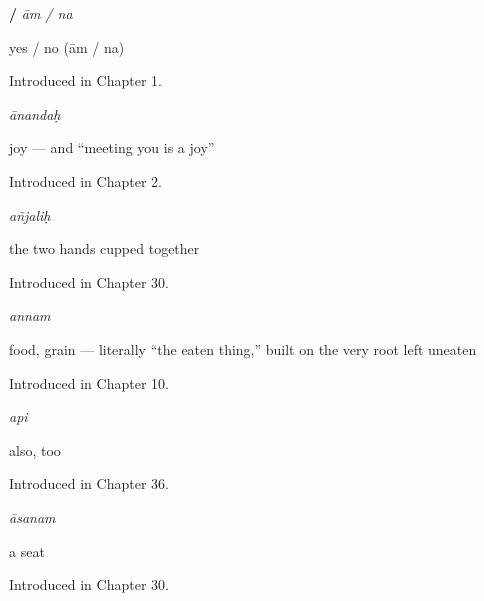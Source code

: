 \noindent\begin{minipage}[t]{\linewidth}
\raggedright
\textbf{ / }\enspace\emph{ām / na}\par
\small yes / no (ām / na)\par
\footnotesize Introduced in Chapter 1.
\end{minipage}\par\medskip

\noindent\begin{minipage}[t]{\linewidth}
\raggedright
\textbf{}\enspace\emph{ānandaḥ}\par
\small joy — and \textquotedblleft{}meeting you is a joy\textquotedblright{}\par
\footnotesize Introduced in Chapter 2.
\end{minipage}\par\medskip

\noindent\begin{minipage}[t]{\linewidth}
\raggedright
\textbf{}\enspace\emph{añjaliḥ}\par
\small the two hands cupped together\par
\footnotesize Introduced in Chapter 30.
\end{minipage}\par\medskip

\noindent\begin{minipage}[t]{\linewidth}
\raggedright
\textbf{}\enspace\emph{annam}\par
\small food, grain — literally \textquotedblleft{}the eaten thing,\textquotedblright{} built on the very root  left uneaten\par
\footnotesize Introduced in Chapter 10.
\end{minipage}\par\medskip

\noindent\begin{minipage}[t]{\linewidth}
\raggedright
\textbf{}\enspace\emph{api}\par
\small also, too\par
\footnotesize Introduced in Chapter 36.
\end{minipage}\par\medskip

\noindent\begin{minipage}[t]{\linewidth}
\raggedright
\textbf{}\enspace\emph{āsanam}\par
\small a seat\par
\footnotesize Introduced in Chapter 30.
\end{minipage}\par\medskip

